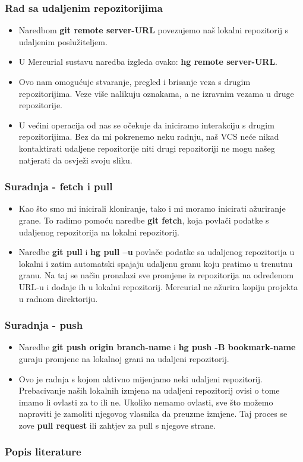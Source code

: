 \documentclass{beamer}
\begin{document}
	\begin{frame}
		\frametitle{Rad sa udaljenim repozitorijima}
		\begin{itemize}
			\item Naredbom \textbf{git remote server-URL} povezujemo naš lokalni repozitorij s udaljenim poslužiteljem.
			\item U Mercurial sustavu naredba izgleda ovako: \textbf{hg remote server-URL}.
			\item  Ovo nam omogućuje stvaranje, pregled i brisanje veza s drugim repozitorijima. Veze više nalikuju oznakama, a ne izravnim vezama u druge repozitorije.
			\item U većini operacija od nas se očekuje da iniciramo interakciju s drugim repozitorijima. Bez da mi pokrenemo neku radnju, naš VCS neće nikad kontaktirati udaljene repozitorije niti drugi repozitoriji ne mogu našeg natjerati da osvježi svoju sliku. 
		\end{itemize}
	\end{frame}

	\begin{frame}
		\frametitle{Suradnja - fetch i pull}
		\begin{itemize}
			\item Kao što smo mi inicirali kloniranje, tako i mi moramo inicirati ažuriranje grane. To radimo pomoću naredbe \textbf{git fetch}, koja povlači podatke s udaljenog repozitorija na lokalni repozitorij.
			\item Naredbe \textbf{git pull} i \textbf{hg pull –u} povlače podatke sa udaljenog repozitorija u lokalni i zatim automatski spajaju udaljenu granu koju pratimo u trenutnu granu. Na taj se način pronalazi sve promjene iz repozitorija na određenom URL-u i dodaje ih u lokalni repozitorij. Mercurial ne ažurira kopiju projekta u radnom direktoriju. 
		\end{itemize}
	\end{frame}

	\begin{frame}
		\frametitle{Suradnja - push}
		\begin{itemize}
			\item Naredbe \textbf{git  push origin branch-name} i \textbf{hg push -B bookmark-name} guraju promjene na lokalnoj grani na udaljeni repozitorij.
			\item  Ovo je radnja s kojom aktivno mijenjamo neki udaljeni repozitorij. Prebacivanje naših lokalnih izmjena na udaljeni repozitorij ovisi o tome imamo li ovlasti za to ili ne. Ukoliko nemamo ovlasti, sve što možemo napraviti je zamoliti njegovog vlasnika da preuzme izmjene. Taj proces se zove \textbf{pull request} ili zahtjev za pull s njegove strane. 
		\end{itemize}
	\end{frame}

	\begin{frame}
		\frametitle{Popis literature}
		
		
		\nocite{VCbE:1}
		\nocite{VC}
		\nocite{ProGit}
		\nocite{WEBSITE:1}	
		 
		
	\end{frame}
\end{document}
